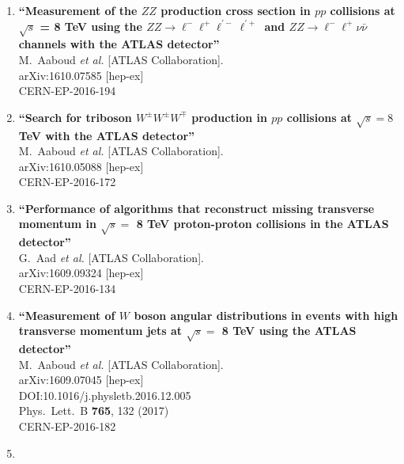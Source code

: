 \documentclass{article}
\begin{document}
\begin{enumerate}
\item%
{\bf ``Measurement of the $ZZ$ production cross section in $pp$ collisions at $\sqrt{s}$ = 8 TeV using the $ZZ\to\ell^{-}\ell^{+}\ell^{\prime -}\ell^{\prime +}$ and $ZZ\to\ell^{-}\ell^{+}\nu\bar{\nu}$ channels with the ATLAS detector''}
  \\{}M.~Aaboud {\it et al.} [ATLAS Collaboration].
  \\{}arXiv:1610.07585 [hep-ex]
  \\{}CERN-EP-2016-194
\item%
{\bf ``Search for triboson $W^{\pm}W^{\pm}W^{\mp}$ production in $pp$ collisions at $\sqrt{s}=8$ TeV with the ATLAS detector''}
  \\{}M.~Aaboud {\it et al.} [ATLAS Collaboration].
  \\{}arXiv:1610.05088 [hep-ex]
  \\{}CERN-EP-2016-172
\item%
{\bf ``Performance of algorithms that reconstruct missing transverse momentum in $\sqrt{s}=$ 8 TeV proton-proton collisions in the ATLAS detector''}
  \\{}G.~Aad {\it et al.} [ATLAS Collaboration].
  \\{}arXiv:1609.09324 [hep-ex]
  \\{}CERN-EP-2016-134
\item%
{\bf ``Measurement of $W$ boson angular distributions in events with high transverse momentum jets at $\sqrt{s}=$ 8 TeV using the ATLAS detector''}
  \\{}M.~Aaboud {\it et al.} [ATLAS Collaboration].
  \\{}arXiv:1609.07045 [hep-ex]
  \\{}DOI:10.1016/j.physletb.2016.12.005
  \\{}Phys.\ Lett.\ B {\bf 765}, 132 (2017)
  \\{}CERN-EP-2016-182
\item%

\end{enumerate}
\end{document}
